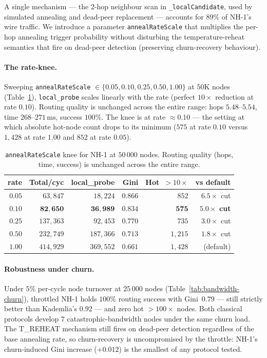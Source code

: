 \documentclass[conference]{IEEEtran}
\newcommand{\nhone}{NH-1\xspace}
\begin{document}
A single mechanism --- the 2-hop neighbour scan in
\texttt{\_localCandidate}, used by simulated annealing and dead-peer
replacement --- accounts for $89\%$ of \nhone's wire traffic. We
introduce a parameter \texttt{annealRateScale} that multiplies the
per-hop annealing trigger probability without disturbing the
temperature-reheat semantics that fire on dead-peer detection
(preserving churn-recovery behaviour).

\paragraph{The rate-knee.} Sweeping
\texttt{annealRateScale} $\in \{0.05, 0.10, 0.25, 0.50, 1.00\}$ at
$50\mathrm{K}$ nodes (Table~\ref{tab:rate-knee}), \texttt{local\_probe}
scales linearly with the rate (perfect $10\times$ reduction at rate
$0.10$). Routing quality is unchanged across the entire range: hops
$5.48$--$5.54$, time $268$--$271\,\mathrm{ms}$, success $100\%$. The
knee is at rate $\approx 0.10$ --- the setting at which absolute
hot-node count drops to its minimum ($575$ at rate $0.10$ versus
$1{,}428$ at rate $1.00$ and $852$ at rate $0.05$).

\begin{table}[t]
\centering
\caption{\texttt{annealRateScale} knee for \nhone at $50\,000$ nodes.
Routing quality (hops, time, success) is unchanged across the entire
range.}
\label{tab:rate-knee}
\small
\begin{tabular}{@{}rrrrrr@{}}
\toprule
\textbf{rate} & \textbf{Total/cyc} & \textbf{local\_probe} &
\textbf{Gini} & \textbf{Hot~$>10\times$} & \textbf{vs default} \\
\midrule
$0.05$ & $63{,}847$ & $18{,}224$ & $0.866$ & $852$ & $6.5\times$ cut \\
$\mathbf{0.10}$ & $\mathbf{82{,}650}$ & $\mathbf{36{,}989}$ &
$\mathbf{0.834}$ & $\mathbf{575}$ & $\mathbf{5.0\times}$ \textbf{cut} \\
$0.25$ & $137{,}363$ & $92{,}453$ & $0.770$ & $735$ & $3.0\times$ cut \\
$0.50$ & $232{,}749$ & $187{,}366$ & $0.713$ & $1{,}215$ &
$1.8\times$ cut \\
$1.00$ & $414{,}929$ & $369{,}552$ & $0.661$ & $1{,}428$ & (default) \\
\bottomrule
\end{tabular}
\end{table}

\paragraph{Robustness under churn.} Under $5\%$ per-cycle node
turnover at $25\,000$ nodes (Table~\ref{tab:bandwidth-churn}),
throttled \nhone holds $100\%$ routing success with
Gini~$0.79$ --- still strictly better than Kademlia's $0.92$ ---
and zero hot $>100\times$ nodes. Both classical protocols develop
$7$ catastrophic-bandwidth nodes under the same churn load. The
T\_REHEAT mechanism still fires on dead-peer detection regardless of
the base annealing rate, so churn-recovery is uncompromised by the
throttle: \nhone's churn-induced Gini increase ($+0.012$) is the
smallest of any protocol tested.
\end{document}
